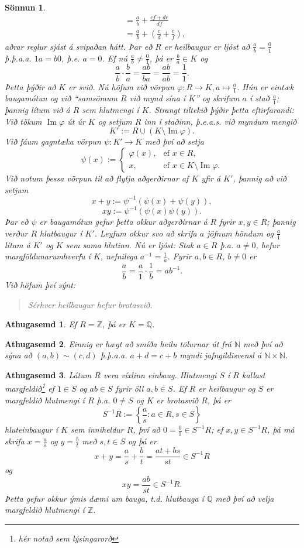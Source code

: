 \documentclass[a4paper,icelandic,11pt]{book}
\theoremstyle{plain}
\newtheorem*{ath}{Athugasemd}
\newtheorem*{sonnun}{Sönnun}
\newcommand{\N}{\mathbb{N}}
\newcommand{\Z}{\mathbb{Z}}
\newcommand{\Q}{\mathbb{Q}}
\DeclareMathOperator{\im}{Im} %
\begin{document}
\begin{sonnun}
\begin{align*}
    &= \frac ab +\frac{cf+de}{df} \\
    &= \frac ab + \left( \frac cd + \frac ef \right),
  \end{align*}
  aðrar reglur sjást á svipaðan hátt. Þar eð $R$ er heilbaugur er ljóst að
  $\frac ab = \frac 01$ þ.þ.a.a. $1a = b0$, þ.e. $a = 0$. Ef nú $\frac ab \neq
  \frac 01$, þá er $\frac ba \in K$ og\[
  \frac ab \cdot \frac ba = \frac{ab}{ba} = \frac{ab}{ab} = \frac 11.
  \]
  Þetta þýðir að $K$ er \emph{svið}. Nú höfum við vörpun $\varphi:R\to
  K,a\mapsto\frac a1$. Hún er eintæk baugamótun og við "`samsömum $R$ við mynd
  sína í $K$"' og skrifum $a$ í stað $\frac a1$; þannig lítum við á $R$ sem
  hlutmengi í $K$. Strangt tiltekið þýðir þetta eftirfarandi: Við tökum
  $\im\varphi$ út úr $K$ og setjum $R$ inn í staðinn, þ.e.a.s. við myndum
  mengið\[
  K' := R\cup (K\setminus \im\varphi).
  \]
  Við fáum gagntæka vörpun $\psi:K'\to K$ með því að setja\[
  \psi(x) := 
  \begin{cases}
    \varphi(x), &\text{ef $x\in R$},\\
    x,          &\text{ef $x\in K\setminus\im\varphi$}.
  \end{cases}
  \]
  Við notum þessa vörpun til að flytja aðgerðirnar af $K$ yfir á $K'$, þannig að
  við setjum\[
  x+y := \psi^{-1}(\psi(x) + \psi(y)),
  \]\[
  xy := \psi^{-1}(\psi(x)\psi(y)).
  \]
  Þar eð $\psi$ er baugamótun gefur þetta okkur aðgerðirnar á $R$ fyrir
  $x,y\in R$; þannig verður $R$ hlutbaugur í $K'$. Leyfum okkur svo að skrifa
  $a$ jöfnum höndum og $\frac a1$ lítum á $K'$ og $K$ sem sama hlutinn. Nú er
  ljóst: Stak $a\in R$ þ.a. $a\neq 0$, hefur margföldunarumhverfu í $K$,
  nefnilega $a^{-1} = \frac 1a$. Fyrir $a,b\in R$, $b\neq 0$ er\[
  \frac ab = \frac a1 \cdot \frac 1b = ab^{-1}.
  \]
  Við höfum því sýnt:
  \begin{quote}
    Sérhver heilbaugur hefur brotasvið.
  \end{quote}
\end{sonnun}
\begin{ath}
  Ef $R=\Z$, þá er $K=\Q$.
\end{ath}
\begin{ath}
  Einnig er hægt að smíða heilu tölurnar út frá $\N$ með því að sýna að
  $(a,b)\sim(c,d)$ þ.þ.a.a. $a+d = c+b$ myndi jafngildisvensl á $\N\times\N$.
\end{ath}
\begin{ath}
  Látum $R$ vera víxlinn einbaug. Hlutmengi $S$ í $R$ kallast
  \emph{margfeldið}\footnote{hér notað sem lýsingarorð} ef
  $1\in S$ og $ab\in S$ fyrir öll $a,b\in S$. Ef $R$ er heilbaugur og $S$ er
  margfeldið hlutmengi í $R$ þ.a. $0\neq S$ og $K$ er brotasvið $R$, þá er\[
  S^{-1}R := \left\{ \frac as : a\in R, s\in S \right\}
  \]
  hluteinbaugur í $K$ sem inniheldur $R$, því að $0=\frac 01\in S^{-1}R$; ef
  $x,y \in S^{-1}R$, þá má skrifa $x=\frac as$ og $y=\frac bt$ með $s,t\in S$ og
  þá er\[
  x+y = \frac as + \frac bt = \frac{at + bs}{st}\in S^{-1}R
  \]
  og 
  $$ xy = \frac{ab}{st}\in S^{-1}R. $$
  Þetta gefur okkur ýmis dæmi um bauga, t.d. hlutbauga í $\Q$ með því að velja
  margfeldið hlutmengi í $\Z$.
\end{ath}
\end{document}
